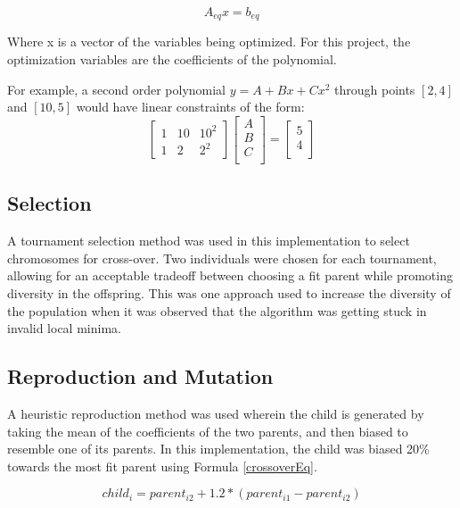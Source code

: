\begin{equation}
A_{eq}x = b_{eq}
\end{equation}

Where x is a vector of the variables being optimized. For this project, the optimization variables are the coefficients of the polynomial.

For example, a second order polynomial $y = A + Bx + Cx^2$ through points $[2 , 4]$ and $[10 , 5]$ would have linear constraints of the form:
\begin{equation}
	\begin{bmatrix}
	1 & 10 & 10^2 \\
	1 & 2 & 2^2
	\end{bmatrix}
	\begin{bmatrix}
	A \\
	B \\
	C \\
	\end{bmatrix} =
	\begin{bmatrix}
	5 \\
	4 \\
	\end{bmatrix}
\end{equation}

\subsection{Selection}
A tournament selection method was used in this implementation to select chromosomes for cross-over. Two individuals were chosen for each tournament, allowing for an acceptable tradeoff between choosing a fit parent while promoting diversity in the offspring. This was one approach used to increase the diversity of the population when it was observed that the algorithm was getting stuck in invalid local minima.

\subsection{Reproduction and Mutation}
A heuristic reproduction method was used wherein the child is generated by taking the mean of the coefficients of the two parents, and then biased to resemble one of its parents. In this implementation, the child was biased 20\% towards the most fit parent using Formula \ref{crossoverEq}.

\begin{equation} \label{crossoverEq}
	child_i = parent_{i2} + 1.2 * (parent_{i1} - parent_{i2})
\end{equation}

